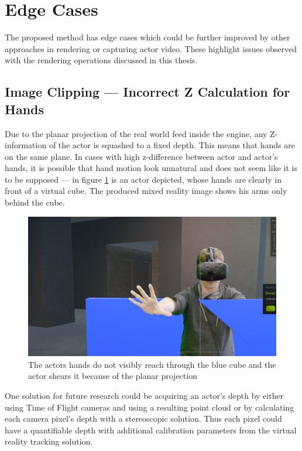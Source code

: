 \section{Edge Cases}

The proposed method has edge cases which could be further improved by other 
approaches in rendering or capturing actor video. These highlight issues 
observed with the rendering operations discussed in this thesis.

\subsection{Image Clipping --- Incorrect Z Calculation for Hands}

Due to the planar projection of the real world feed inside the engine, any 
Z-information of the actor is squashed to a fixed depth. This means that hands 
are on the same plane. In cases with high z-difference between actor and 
actor's hands, it is possible that hand motion look unnatural and does not seem 
like it is to be supposed --- in figure \ref{fig:edge:z-clipping} is an actor 
depicted, whose hands are clearly in front of a virtual cube. The produced 
mixed reality image shows his arms only behind the cube.

\begin{figure}[htb]
	\centering
	\includegraphics[width=\textwidth]{gfx/issues/z-clipping.png}
	\caption{The actors hands do not visibly reach through the blue cube and 
	the actor shears it because of the planar projection}
	\label{fig:edge:z-clipping}
\end{figure}

One solution for future research could be acquiring an actor's depth by either 
using Time of Flight cameras and using a resulting point cloud or by 
calculating each camera pixel's depth with a stereoscopic solution. Thus each 
pixel could have a quantifiable depth with additional calibration parameters 
from the virtual reality tracking solution.

